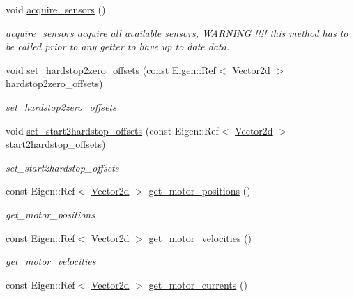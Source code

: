 \begin{DoxyCompactItemize}
void \hyperlink{classblmc__robots_1_1Stuggihop_a594cb654f63c3ff8fb7718ce7d393d81}{acquire\+\_\+sensors} ()
\begin{DoxyCompactList}\small\item\em acquire\+\_\+sensors acquire all available sensors, W\+A\+R\+N\+I\+NG !!!! this method has to be called prior to any getter to have up to date data. \end{DoxyCompactList}\item 
void \hyperlink{classblmc__robots_1_1Stuggihop_a5f0707d8965fc98b36ca3fa42b57db5f}{set\+\_\+hardstop2zero\+\_\+offsets} (const Eigen\+::\+Ref$<$ \hyperlink{common__header_8hpp_acb6916bc8c9fe9d98c484fd4cc201447}{Vector2d} $>$ hardstop2zero\+\_\+offsets)
\begin{DoxyCompactList}\small\item\em set\+\_\+hardstop2zero\+\_\+offsets \end{DoxyCompactList}\item 
void \hyperlink{classblmc__robots_1_1Stuggihop_afb35c29fd6e5eb97337857fd34532a6d}{set\+\_\+start2hardstop\+\_\+offsets} (const Eigen\+::\+Ref$<$ \hyperlink{common__header_8hpp_acb6916bc8c9fe9d98c484fd4cc201447}{Vector2d} $>$ start2hardstop\+\_\+offsets)
\begin{DoxyCompactList}\small\item\em set\+\_\+start2hardstop\+\_\+offsets \end{DoxyCompactList}\item 
const Eigen\+::\+Ref$<$ \hyperlink{common__header_8hpp_acb6916bc8c9fe9d98c484fd4cc201447}{Vector2d} $>$ \hyperlink{classblmc__robots_1_1Stuggihop_a8d9d32080e9262b319f4f4ce7d85bac1}{get\+\_\+motor\+\_\+positions} ()
\begin{DoxyCompactList}\small\item\em get\+\_\+motor\+\_\+positions \end{DoxyCompactList}\item 
const Eigen\+::\+Ref$<$ \hyperlink{common__header_8hpp_acb6916bc8c9fe9d98c484fd4cc201447}{Vector2d} $>$ \hyperlink{classblmc__robots_1_1Stuggihop_accb7420eaa50dafb84c434623697a272}{get\+\_\+motor\+\_\+velocities} ()
\begin{DoxyCompactList}\small\item\em get\+\_\+motor\+\_\+velocities \end{DoxyCompactList}\item 
const Eigen\+::\+Ref$<$ \hyperlink{common__header_8hpp_acb6916bc8c9fe9d98c484fd4cc201447}{Vector2d} $>$ \hyperlink{classblmc__robots_1_1Stuggihop_a6da6fdecb11573e52a0c059d84e7f4c5}{get\+\_\+motor\+\_\+currents} ()

\end{DoxyCompactItemize}
